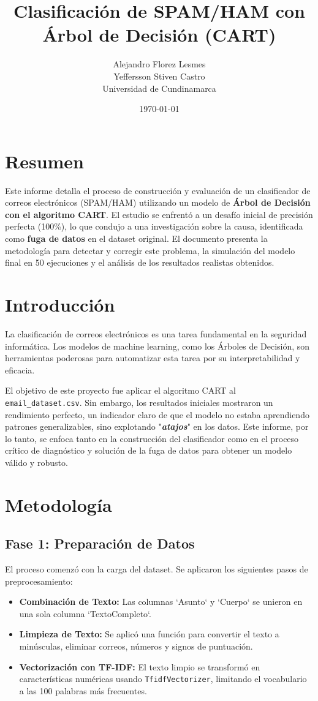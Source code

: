 \documentclass[12pt, a4paper]{article}
\title{Clasificación de SPAM/HAM con Árbol de Decisión (CART)}
\author{
    Alejandro Florez Lesmes \\ 
    Yeffersson Stiven Castro \\
    \vspace{0.5cm}
    Universidad de Cundinamarca
}
\date{\today}
\begin{document}
\maketitle
\thispagestyle{empty}
\newpage


\newpage

\section{Resumen}
Este informe detalla el proceso de construcción y evaluación de un clasificador de correos electrónicos (SPAM/HAM) utilizando un modelo de \textbf{Árbol de Decisión con el algoritmo CART}. El estudio se enfrentó a un desafío inicial de precisión perfecta (100\%), lo que condujo a una investigación sobre la causa, identificada como \textbf{fuga de datos} en el dataset original. El documento presenta la metodología para detectar y corregir este problema, la simulación del modelo final en 50 ejecuciones y el análisis de los resultados realistas obtenidos.

\section{Introducción}
La clasificación de correos electrónicos es una tarea fundamental en la seguridad informática. Los modelos de machine learning, como los Árboles de Decisión, son herramientas poderosas para automatizar esta tarea por su interpretabilidad y eficacia.

El objetivo de este proyecto fue aplicar el algoritmo CART al \texttt{email\_dataset.csv}. Sin embargo, los resultados iniciales mostraron un rendimiento perfecto, un indicador claro de que el modelo no estaba aprendiendo patrones generalizables, sino explotando "\textbf{\textit{atajos}}" en los datos. Este informe, por lo tanto, se enfoca tanto en la construcción del clasificador como en el proceso crítico de diagnóstico y solución de la fuga de datos para obtener un modelo válido y robusto.

\section{Metodología}

\subsection{Fase 1: Preparación de Datos}
El proceso comenzó con la carga del dataset. Se aplicaron los siguientes pasos de preprocesamiento:
\begin{itemize}
    \item \textbf{Combinación de Texto:} Las columnas `Asunto` y `Cuerpo` se unieron en una sola columna `TextoCompleto`.
    \item \textbf{Limpieza de Texto:} Se aplicó una función para convertir el texto a minúsculas, eliminar correos, números y signos de puntuación.
    \item \textbf{Vectorización con TF-IDF:} El texto limpio se transformó en características numéricas usando \texttt{TfidfVectorizer}, limitando el vocabulario a las 100 palabras más frecuentes.
\end{itemize}
\end{document}
